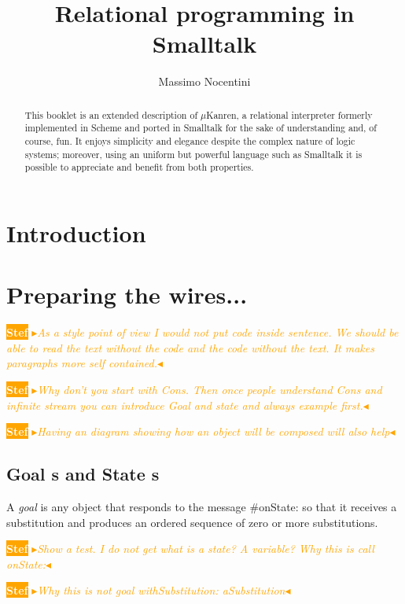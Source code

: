 \documentclass[a4paper,11pt]{article}
\author{Massimo Nocentini}
\title{Relational programming in Smalltalk}
\newcommand{\nb}[3]{
		{\colorbox{#2}{\bfseries\sffamily\scriptsize\textcolor{white}{#1}}}
		{\textcolor{#2}{\sf\small$\blacktriangleright$\textit{#3}$\blacktriangleleft$}}}
\newcommand{\nb}[3]{}
\newcommand{\sd}[1]{\nb{Stef}{orange}{#1}}
\newcommand{\ct}[1]{{\textsf{#1}}\xspace}
\begin{document}
\maketitle

\begin{abstract}
This booklet is an extended description of $\mu$Kanren, a relational
interpreter formerly implemented in Scheme and ported in Smalltalk for the sake
of understanding and, of course, fun. It enjoys simplicity and elegance despite
the complex nature of logic systems; moreover, using an uniform but powerful
language such as Smalltalk it is possible to appreciate and benefit from both
properties.
\end{abstract}

\section*{Introduction}



\tableofcontents

\section{Preparing the wires...}

\sd{As a style point of view I would not put code inside sentence. We should be able to read the text without the code and the code without the text. It makes paragraphs more self contained.}

\sd{Why don't you start with Cons. Then once people understand Cons and infinite stream
you can introduce Goal and state and always example first.}

\sd{Having an diagram showing how an object will be composed will also help}

\subsection{\ct{Goal}s and \ct{State}s}

A \textit{goal} is any object that responds to the message \ct{\#onState:} so
that it receives a substitution and produces an ordered sequence of zero or
more substitutions.

\sd{Show a test. I do not get what is a state? A variable? Why this is call onState:}
\sd{Why this is not \ct{goal withSubstitution: aSubstitution}}
\end{document}
